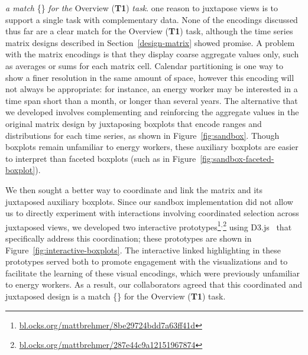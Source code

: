 \documentclass[journal]{vgtc}                %
\newcommand*\match{\textcolor{darkGreen}{\ding{52}}}
\newcommand{\bstart}[1]{\vspace{1mm} \noindent{\textbf{#1:}}}
\newcommand{\jn}[1]{\textcolor{darkGreen}{#1}}
\begin{document}
\bstart{Juxtaposed matrix and boxplots} {\it a match} \{\match\} {\it for the} Overview ({\bf T1}) {\it task}.
one reason to juxtapose views is to support a single task with complementary data.
None of the encodings discussed thus far are a clear match for the Overview ({\bf T1}) task, although the time series matrix designs described in Section~\ref{design-matrix} showed promise.
A problem with the matrix encodings is that they display coarse aggregate values only, such as averages or sums for each matrix cell. 
Calendar partitioning is one way to show a finer resolution in the same amount of space, however this encoding will not always be appropriate: for instance, an energy worker may be interested in a time span short than a month, or longer than several years.
The alternative that we developed involves complementing and reinforcing the aggregate values in the original matrix design by juxtaposing boxplots that encode ranges and distributions for each time series, as shown in Figure~\ref{fig:sandbox}.
Though boxplots remain unfamiliar to energy workers, these auxiliary boxplots are easier to interpret than faceted boxplots (such as in Figure~\ref{fig:sandbox-faceted-boxplot}). 

We then sought a better way to coordinate and link the matrix and its juxtaposed auxiliary boxplots.
Since our sandbox implementation did not allow us to directly experiment with interactions involving coordinated selection across juxtaposed views, we developed two interactive prototypes\footnote{\url{bl.ocks.org/mattbrehmer/8be29724bdd7a63ff41d}}$^,$\footnote{\url{bl.ocks.org/mattbrehmer/287e44c9a12151967874}} using D3.js~\cite{Bostock2011} that specifically address this coordination; these prototypes are shown in Figure~\ref{fig:interactive-boxplots}.
The interactive linked highlighting in these prototypes served both to promote engagement with the visualizations and to facilitate the learning of these visual encodings, which were previously unfamiliar to energy workers. 
As a result, our collaborators agreed that this coordinated and juxtaposed design is a match \{\match\} for the Overview ({\bf T1}) task.
\end{document}
